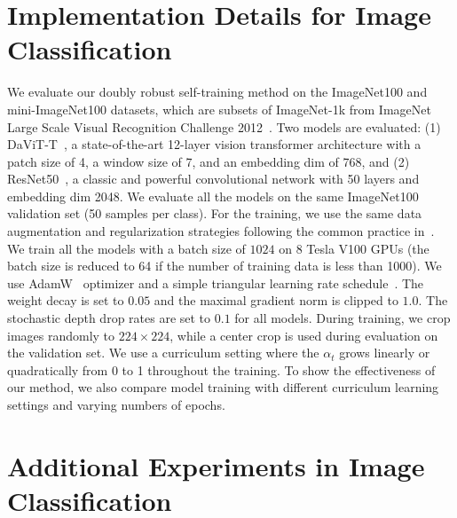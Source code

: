 

\section{Implementation Details for Image Classification}
We evaluate our doubly robust self-training method on the ImageNet100 and mini-ImageNet100 datasets, which are subsets of ImageNet-1k from ImageNet Large Scale Visual Recognition Challenge 2012~\citep{russakovsky2015imagenet}.
%
Two models are evaluated: (1) DaViT-T~\citep{ding2022davit}, a state-of-the-art 12-layer vision transformer architecture with a patch size of 4, a window size of 7, and an embedding dim of 768, and (2) ResNet50~\citep{he2016deep}, a classic and powerful convolutional network with 50 layers and embedding dim 2048.
%
We evaluate all the models on the same ImageNet100 validation set (50 samples per class). 
%
For the training, we use the same data augmentation and regularization strategies following the common practice in~\cite{liu2021swin,lin2017focal,ding2022davit}. We train all the models with a batch size of $1024$ on 8 Tesla V100 GPUs (the batch size is reduced to 64 if the number of training data is less than 1000). We use AdamW~\citep{loshchilov2017decoupled} optimizer and a simple triangular learning rate schedule~\citep{smith2019super}. The weight decay is set to $0.05$ and the maximal gradient norm is clipped to $1.0$. The stochastic depth drop rates are set to $0.1$ for all models. During training, we crop images randomly to $224 \times 224$, while a center crop is used during evaluation on the validation set. We use a curriculum setting where the $\alpha_t$ grows linearly or quadratically from 0 to 1 throughout the training.
%
To show the effectiveness of our method, we also compare model training with different curriculum learning settings and varying numbers of epochs.




\section{Additional Experiments in Image Classification}

